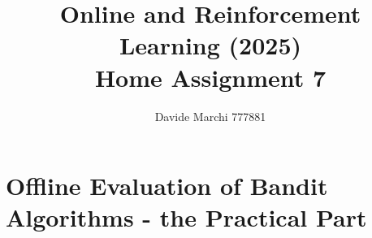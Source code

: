 \documentclass[a4paper,12pt]{article}
\begin{document}
\title{Online and Reinforcement Learning (2025)\\Home Assignment 7}
\author{\color{red}Davide Marchi 777881}
\date{}
\maketitle

\tableofcontents %
\newpage %



%

\section{Offline Evaluation of Bandit Algorithms - the Practical Part}


%

%

    
\end{document}
